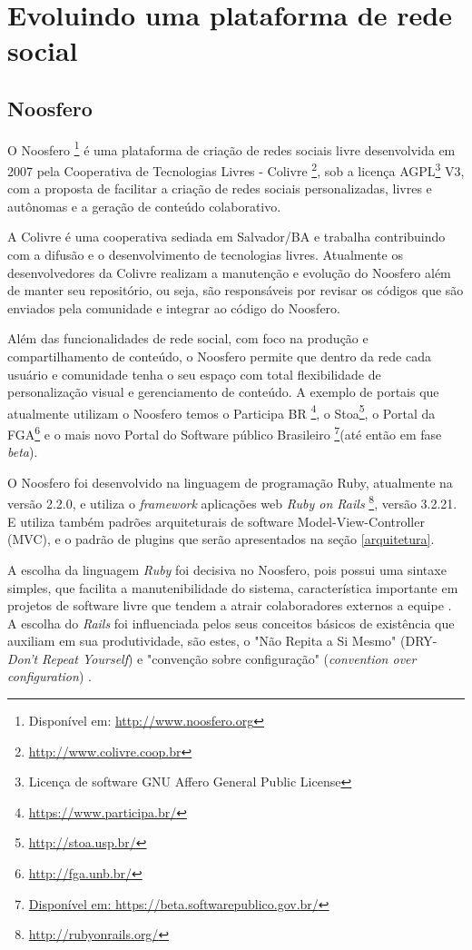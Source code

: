 \chapter{Evoluindo uma plataforma de rede social}
\label{evol-rede-social}
%
\section{Noosfero}
\label{noosfero}

O Noosfero \footnote{Disponível em: \url{http://www.noosfero.org}} é uma plataforma de criação de redes sociais livre desenvolvida em 2007 pela Cooperativa de Tecnologias Livres - Colivre \footnote{\url{http://www.colivre.coop.br}}, sob a licença AGPL\footnote{Licença de software GNU Affero General Public License} V3, com a proposta de facilitar a criação de redes sociais personalizadas, livres e autônomas e a geração de conteúdo colaborativo.

A Colivre é uma cooperativa sediada em Salvador/BA e trabalha contribuindo  com a difusão e o desenvolvimento de tecnologias livres. Atualmente os desenvolvedores da Colivre realizam a manutenção e evolução do Noosfero além de manter seu repositório, ou seja, são responsáveis por revisar os códigos que são enviados pela comunidade e integrar ao código do Noosfero.

Além das funcionalidades de rede social, com foco na produção e compartilhamento de
conteúdo, o Noosfero permite que dentro da rede cada usuário e comunidade tenha o seu espaço com total flexibilidade de personalização visual e gerenciamento de conteúdo. A exemplo de portais que atualmente utilizam o Noosfero temos o Participa BR \footnote{\url{https://www.participa.br/}}, o Stoa\footnote{\url{http://stoa.usp.br/}}, o Portal da FGA\footnote{\url{http://fga.unb.br/}} e o mais novo Portal do Software público Brasileiro \footnote{\url{Disponível em: https://beta.softwarepublico.gov.br/}}(até então em fase \textit{beta}).

O Noosfero foi desenvolvido na linguagem de programação Ruby, atualmente na versão 2.2.0, e utiliza o \textit{framework} aplicações web \textit{Ruby on Rails} \footnote{\url{http://rubyonrails.org/}}, versão 3.2.21. E utiliza também padrões arquiteturais de software Model-View-Controller (MVC), e o padrão de plugins que serão apresentados na seção \ref{arquitetura}.

A escolha da linguagem \textit{Ruby} foi decisiva no Noosfero, pois possui uma sintaxe simples, que facilita a manutenibilidade do sistema, característica importante em projetos de software livre que tendem a atrair colaboradores externos a equipe \cite{meirelles2013}. A escolha do \textit{Rails} foi influenciada pelos seus conceitos básicos de existência que auxiliam em sua produtividade, são estes, o "Não Repita a Si Mesmo" (DRY-\textit{Don't Repeat Yourself}) e "convenção sobre configuração" (\textit{convention over configuration}) \cite{akita2006repensando}.


